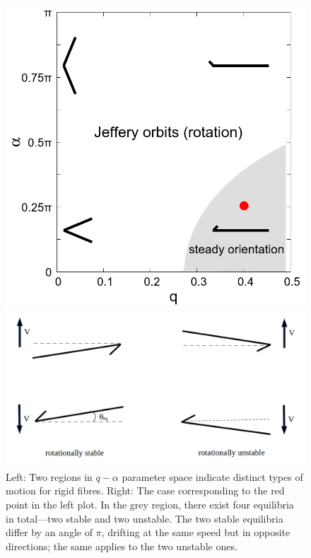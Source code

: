 \documentclass[a4paper,12pt]{report}
\begin{document}
\begin{figure}[htbp]
	\centering
	\begin{minipage}[t]{0.4\textwidth}
		\centering
		\includegraphics[width=\linewidth]{plot/rigid_case/q_alpha_plot_with_point.png}
	\end{minipage}
	\hfill
	\begin{minipage}[t]{0.58\textwidth}
		\centering
		\includegraphics[width=\linewidth]{plot/rigid_case/q_alpha_plot_with_point_four_equilibria.png}
	\end{minipage}
	\caption{Left: Two regions in $q-\alpha$ parameter space indicate distinct types of motion for rigid fibres. Right: The case corresponding to the red point in the left plot. In the grey region, there exist four equilibria in total—two stable and two unstable. The two stable equilibria differ by an angle of $\pi$, drifting at the same speed but in opposite directions; the same applies to the two unstable ones.}
\end{figure}
\end{document}
